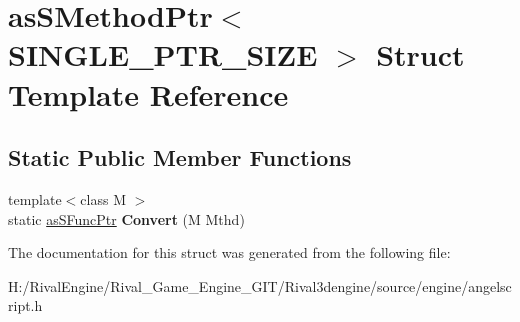 \hypertarget{structas_s_method_ptr_3_01_s_i_n_g_l_e___p_t_r___s_i_z_e_01_4}{}\section{as\+S\+Method\+Ptr$<$ S\+I\+N\+G\+L\+E\+\_\+\+P\+T\+R\+\_\+\+S\+I\+ZE $>$ Struct Template Reference}
\label{structas_s_method_ptr_3_01_s_i_n_g_l_e___p_t_r___s_i_z_e_01_4}
\subsection*{Static Public Member Functions}
\begin{DoxyCompactItemize}
\item 
\mbox{\label{structas_s_method_ptr_3_01_s_i_n_g_l_e___p_t_r___s_i_z_e_01_4_a129f088107efd4f884fadac68fa4226c}} 
{\footnotesize template$<$class M $>$ }\\static \hyperlink{structas_s_func_ptr}{as\+S\+Func\+Ptr} {\bfseries Convert} (M Mthd)
\end{DoxyCompactItemize}


The documentation for this struct was generated from the following file\+:\begin{DoxyCompactItemize}
\item 
H\+:/\+Rival\+Engine/\+Rival\+\_\+\+Game\+\_\+\+Engine\+\_\+\+G\+I\+T/\+Rival3dengine/source/engine/angelscript.\+h\end{DoxyCompactItemize}
